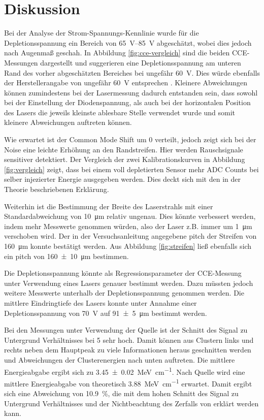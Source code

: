 \section{Diskussion}
\label{sec:Diskussion}

Bei der Analyse der Strom-Spannungs-Kennlinie wurde für die Depletionsspannung ein
Bereich von \SIrange{65}{85}{\volt} abgeschätzt, wobei dies jedoch nach Augenmaß
geschah. In Abbildung \ref{fig:cce-vergleich} sind die beiden CCE-Messungen dargestellt
und suggerieren eine Depletionsspannung am unteren Rand des vorher abgeschätzten Bereiches
bei ungefähr \SI{60}{\volt}.
Dies würde ebenfalls der Herstellerangabe von ungefähr \SI{60}{\volt} entsprechen \cite{alibava}.
Kleinere Abweichungen können zumindestens bei der Lasermessung dadurch entstanden sein,
dass sowohl bei der Einstellung der Diodenspannung, als auch bei der horizontalen
Position des Lasers die jeweils kleinste ablesbare Stelle verwendet wurde und somit
kleinere Abweichungen auftreten können.

Wie erwartet ist der Common Mode Shift um \num{0} verteilt, jedoch zeigt sich bei
der Noise eine leichte Erhöhung an den Randstreifen. Hier werden Rauschsignale
sensitiver detektiert.
Der Vergleich der zwei Kalibrationskurven in Abbildung \ref{fig:vergleich} zeigt,
dass bei einem voll depletierten Sensor mehr ADC Counts bei selber injezierter
Energie ausgegeben werden. Dies deckt sich mit den in der Theorie beschriebenen
Erklärung.

Weiterhin ist die Bestimmung der Breite des Laserstrahls mit einer Standardabweichung
von \SI{10}{\micro\meter} relativ ungenau. Dies könnte verbessert werden, indem
mehr Messwerte genommen würden, also der Laser z.B. immer um \SI{1}{\micro\meter}
verschoben wird.
Der in der Versuchsanleitung angegebene pitch der Streifen von \SI{160}{\micro\meter}
\cite[13]{anleitung} konnte bestätigt werden. Aus Abbildung \ref{fig:streifen}
ließ ebenfalls sich ein pitch von \SI{160(10)}{\micro\meter} bestimmen.

Die Depletionsspannung könnte als Regressionsparameter der CCE-Messung unter Verwendung
eines Lasers genauer bestimmt werden. Dazu müssten jedoch weitere Messwerte
unterhalb der Depletionsspannung genommen werden.
Die mittlere Eindringtiefe des Lasers konnte unter Annahme einer Depletionsspannung
von \SI{70}{\volt} auf \SI{91(5)}{\micro\meter} bestimmt werden.

Bei den Messungen unter Verwendung der Quelle ist der Schnitt des Signal zu Untergrund
Verhältnisses bei \num{5} sehr hoch. Damit können aus Clustern links und rechts neben dem
Hauptpeak zu viele Informationen heraus geschnitten werden und Abweichungen der
Clusterenergien nach unten auftreten.
Die mittlere Energieabgabe ergibt sich zu \SI{3.45(2)}{\mega\electronvolt\per\centi\meter}.
Nach Quelle \cite[9]{anleitung} wird eine mittlere Energieabgabe von theoretisch
\SI{3.88}{\mega\electronvolt\per\centi\meter} erwartet.
Damit ergibt sich eine Abweichung von \SI{10.9}{\percent}, die mit dem hohen Schnitt des
Signal zu Untergrund Verhältnisses und der Nichtbeachtung des Zerfalls von 
erklärt werden kann.
